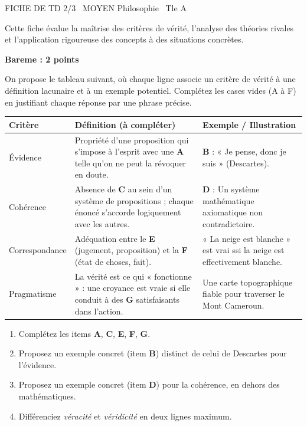 \documentclass[11pt]{article}
\begin{document}
\begin{tcolorbox}[enhanced,colback=popink,colframe=popink,arc=10pt,boxrule=0pt,left=12pt,right=12pt,top=9pt,bottom=9pt]
{\color{white}\popxbold\small FICHE DE TD 2/3 \textbullet\ MOYEN \hfill Philosophie \textbullet\ Tle A\par}
\end{tcolorbox}
\vspace{4pt}
Cette fiche évalue la maîtrise des critères de vérité, l'analyse des théories rivales et l'application rigoureuse des concepts à des situations concrètes.

\begin{exercice}
\noindent\textbf{Bareme : 2 points}\par\medskip
On propose le tableau suivant, où chaque ligne associe un critère de vérité à une définition lacunaire et à un exemple potentiel. Complétez les cases vides (A à F) en justifiant chaque réponse par une phrase précise.

\begin{tabularx}{\linewidth}{|X|X|X|}
\hline
\textbf{Critère} & \textbf{Définition (à compléter)} & \textbf{Exemple / Illustration} \\
\hline
Évidence & Propriété d'une proposition qui s'impose à l'esprit avec une \textbf{A} telle qu'on ne peut la révoquer en doute. & \textbf{B} : « Je pense, donc je suis » (Descartes). \\
\hline
Cohérence & Absence de \textbf{C} au sein d'un système de propositions ; chaque énoncé s'accorde logiquement avec les autres. & \textbf{D} : Un système mathématique axiomatique non contradictoire. \\
\hline
Correspondance & Adéquation entre le \textbf{E} (jugement, proposition) et la \textbf{F} (état de choses, fait). & « La neige est blanche » est vrai ssi la neige est effectivement blanche. \\
\hline
Pragmatisme & La vérité est ce qui « fonctionne » : une croyance est vraie si elle conduit à des \textbf{G} satisfaisants dans l'action. & Une carte topographique fiable pour traverser le Mont Cameroun. \\
\hline
\end{tabularx}

\begin{enumerate}
    \item Complétez les items \textbf{A}, \textbf{C}, \textbf{E}, \textbf{F}, \textbf{G}.
    \item Proposez un exemple concret (item \textbf{B}) distinct de celui de Descartes pour l'évidence.
    \item Proposez un exemple concret (item \textbf{D}) pour la cohérence, en dehors des mathématiques.
    \item Différenciez \textit{véracité} et \textit{véridicité} en deux lignes maximum.
\end{enumerate}
\end{exercice}
\end{document}
